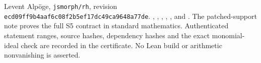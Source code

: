{\raggedright
Levent Alp\"oge, \texttt{jsmorph/rh},
revision \texttt{ecd09ff9b4aaf6c08f2b5ef17dc49ca9648a77de}.
,
,
,
,
, and
.
The patched-support note proves the full S5 contract in standard
mathematics.  Authenticated statement ranges, source hashes,
dependency hashes and the exact monomial-ideal check are recorded
in the  certificate.
No Lean build or arithmetic nonvanishing is asserted.
\par}
